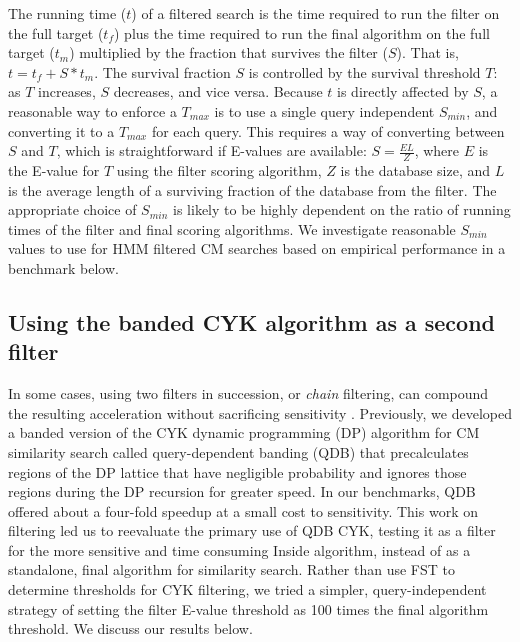 The running time ($t$) of a filtered search is the time required to
run the filter on the full target ($t_f$) plus the time required to
run the final algorithm on the full target ($t_m$) multiplied by the
fraction that survives the filter ($S$).  That is, $t = t_f + S *
t_m$.  The survival fraction $S$ is controlled by the survival
threshold $T$: as $T$ increases, $S$ decreases, and vice versa.  
Because $t$ is directly affected by $S$, a reasonable way to enforce a
$T_{max}$ is to use a single query independent $S_{min}$, and
converting it to a $T_{max}$ for each query. This requires a way of
converting between $S$ and $T$, which is straightforward if E-values
are available: $S=\frac{EL}{Z}$, where $E$ is the E-value for $T$
using the filter scoring algorithm, $Z$ is the database size, and $L$
is the average length of a surviving fraction of the database from the
filter. The appropriate choice of $S_{min}$ is likely to be highly
dependent on the ratio of running times of the filter and final scoring
algorithms. We investigate reasonable $S_{min}$ values to use for HMM
filtered CM searches based on empirical performance in a benchmark
below.

\subsection{Using the banded CYK algorithm as a second filter}
In some cases, using two filters in succession, or \emph{chain}
filtering, can compound the resulting acceleration without sacrificing
sensitivity \citep{Zhang06}.
Previously, we developed a banded version of the CYK dynamic
programming (DP) algorithm for CM similarity search called
query-dependent banding (QDB) \citep{NawrockiEddy07} that
precalculates regions of the DP lattice that have negligible
probability and ignores those regions during the DP recursion for
greater speed. In our benchmarks, QDB offered about a four-fold
speedup at a small cost to sensitivity. This work on filtering led us
to reevaluate the primary use of QDB CYK, testing it as a filter for
the more sensitive and time consuming Inside algorithm, instead of as
a standalone, final algorithm for similarity search.  Rather than use
FST to determine thresholds for CYK filtering, we tried a simpler,
query-independent strategy of setting the filter E-value threshold as
100 times the final algorithm threshold. We discuss our results below.

